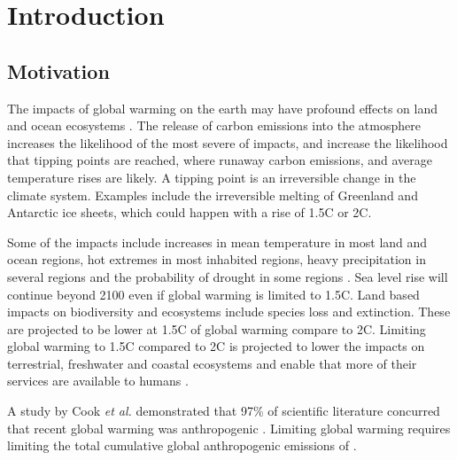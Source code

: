 
\chapter{Introduction}  %
\label{chapter:intro}


\ifpdf
    \graphicspath{{Chapter1/Figs/Raster/}{Chapter1/Figs/PDF/}{Chapter1/Figs/}}
\else
    \graphicspath{{Chapter1/Figs/Vector/}{Chapter1/Figs/}}
\fi


\section{Motivation} %


The impacts of global warming on the earth may have profound effects on land and ocean ecosystems \cite{IPCC2018}. The release of carbon emissions into the atmosphere increases the likelihood of the most severe of impacts, and increase the likelihood that tipping points are reached, where runaway carbon emissions, and average temperature rises are likely. A tipping point is an irreversible change in the climate system. Examples include the irreversible melting of Greenland and Antarctic ice sheets, which could happen with a rise of 1.5\degree C or 2\degree C. 

Some of the impacts include increases in mean temperature in most land and ocean regions, hot extremes in most inhabited regions, heavy precipitation in several regions and the probability of drought in some regions \cite{IPCC2018}. Sea level rise will continue beyond 2100 even if global warming is limited to 1.5\degree C. Land based impacts on biodiversity and ecosystems include species loss and extinction. These are projected to be lower at 1.5\degree C of global warming compare to 2\degree C. Limiting global warming to 1.5\degree C compared to 2\degree C is projected to lower the impacts on terrestrial, freshwater and coastal ecosystems and enable that more of their services are available to humans \cite{IPCC2018}.

A study by Cook \textit{et al.} demonstrated that 97\% of scientific literature concurred that recent global warming was anthropogenic \cite{Cook2013}. Limiting global warming requires limiting the total cumulative global anthropogenic emissions of  \cite{Masson-Delmotte2018}. 

